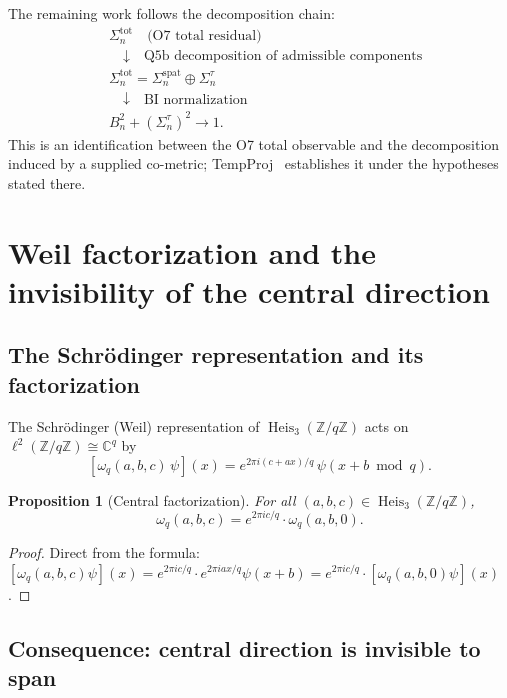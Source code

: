 \documentclass[11pt]{article}
\newtheorem{proposition}[theorem]{Proposition}
\begin{document}
    The remaining work follows the decomposition chain:
    \begin{align*}
      &\Sigma_n^{\mathrm{tot}} \quad \text{(O7 total residual)}\\
      &\quad \downarrow \quad \text{Q5b decomposition of admissible components}\\
      &\Sigma_n^{\mathrm{tot}} = \Sigma_n^{\mathrm{spat}} \oplus \Sigma_n^\tau\\
      &\quad \downarrow \quad \text{BI normalization}\\
      &B_n^2 + (\Sigma_n^\tau)^2 \to 1.
    \end{align*}
    This is an identification between the O7 total observable and the decomposition induced by a supplied
    co-metric; TempProj~\cite{Beau2026tp} establishes it under the hypotheses stated there.

  \section{Weil factorization and the invisibility of the central direction}
  \label{sec:weil-factorization}

  \subsection{The Schr\"odinger representation and its factorization}

    The Schr\"odinger (Weil) representation of $\operatorname{Heis}_3(\mathbb{Z}/q\mathbb{Z})$
    acts on $\ell^2(\mathbb{Z}/q\mathbb{Z}) \cong \mathbb{C}^q$ by
    \[
      [\omega_q(a,b,c)\,\psi](x)
      =
      e^{2\pi i(c+ax)/q}\,\psi(x+b \bmod q).
    \]

    \begin{proposition}[Central factorization]
      \label{prop:factorization}
      For all $(a,b,c) \in \operatorname{Heis}_3(\mathbb{Z}/q\mathbb{Z})$,
      \[
        \omega_q(a,b,c) = e^{2\pi ic/q}\cdot\omega_q(a,b,0).
      \]
    \end{proposition}

    \begin{proof}
      Direct from the formula: $[\omega_q(a,b,c)\psi](x) = e^{2\pi ic/q}\cdot e^{2\pi iax/q}\psi(x+b)
      = e^{2\pi ic/q}\cdot [\omega_q(a,b,0)\psi](x)$.
    \end{proof}

  \subsection{Consequence: central direction is invisible to span}
\end{document}

